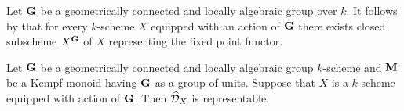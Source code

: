 \begin{remark}\label{remark:existence_of_fixed_points_for_geom_conn_locally_alg_group}
Let $\mathbf{G}$ be a geometrically connected and locally algebraic group over $k$. It follows by {\cite[Theorem 7.2]{Group_schemes_over_field}} that for every $k$-scheme $X$ equipped with an action of $\mathbf{G}$ there exists closed subscheme $X^{\mathbf{G}}$ of $X$ representing the fixed point functor.
\end{remark}

\begin{theorem}
Let $\mathbf{G}$ be a geometrically connected and locally algebraic group $k$-scheme and $\mathbf{M}$ be a Kempf monoid having $\mathbf{G}$ as a group of units. Suppose that $X$ is a $k$-scheme equipped with action of $\mathbf{G}$. Then $\widehat{{\mathcal D}}_X$ is representable.

\end{theorem}
























\small





